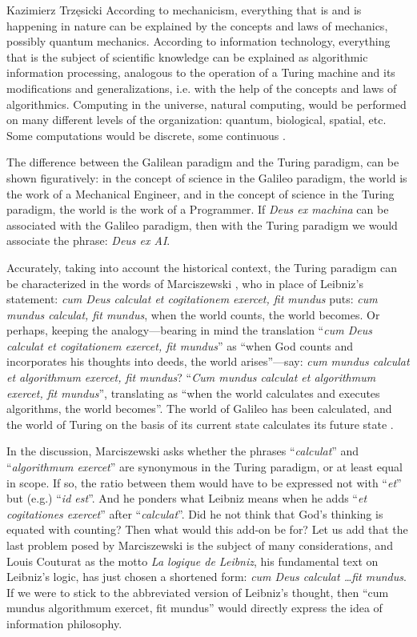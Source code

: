 \begin{artengenv}{Kazimierz Trzęsicki}
According to mechanicism, everything that is and is happening in nature can be explained by the concepts and laws of mechanics, possibly quantum mechanics. According to information technology, everything that is the subject of scientific knowledge can be explained as algorithmic information processing, analogous to the operation of a Turing machine and its modifications and generalizations, i.e. with the help of the concepts and laws of algorithmics. Computing in the universe, natural computing, would be performed on many different levels of the organization: quantum, biological, spatial, etc. Some computations would be discrete, some continuous \parencite{Lesne2007}.

The difference between the Galilean paradigm and the Turing paradigm, can be shown figuratively: in the concept of science in the Galileo paradigm, the world is the work of a Mechanical Engineer, and in the concept of science in the Turing paradigm, the world is the work of a Programmer. If \emph{Deus ex machina} can be associated with the Galileo paradigm, then with the Turing paradigm we would associate the phrase: \emph{Deus ex AI}.

Accurately, taking into account the historical context, the Turing paradigm can be characterized in the words of Marciszewski \parencite[p.153]{MarciszewskiStacewicz2011}, who in place of Leibniz's statement: \emph{cum Deus calculat et cogitationem exercet, fit mundus} puts: \emph{cum mundus calculat, fit mundus}, when the world counts, the world becomes. Or perhaps, keeping the analogy---bearing in mind the translation ``\emph{cum Deus calculat et cogitationem exercet, fit mundus}'' as ``when God counts and incorporates his thoughts into deeds, the world arises''---say: \emph{cum mundus calculat et algorithmum exercet, fit mundus}? ``\emph{Cum mundus calculat et algorithmum exercet, fit mundus}'', translating as ``when the world calculates and executes algorithms, the world becomes''. The world of Galileo has been calculated, and the world of Turing on the basis of its current state calculates its future state \parencite[p.13]{Chaitin2007a}.

In the discussion, Marciszewski asks whether the phrases ``\emph{calculat}'' and ``\emph{algorithmum exercet}'' are synonymous in the Turing paradigm, or at least equal in scope. If so, the ratio between them would have to be expressed not with ``\emph{et}'' but (e.g.) ``\emph{id est}''. And he ponders what Leibniz means when he adds ``\emph{et cogitationes exercet}'' after ``\emph{calculat}''. Did he not think that God's thinking is equated with counting? Then what would this add-on be for? Let us add that the last problem posed by Marciszewski is the subject of many considerations, and Louis Couturat \parencite*{Couturat1901} as the motto \emph{La logique de {L}eibniz}, his fundamental text on Leibniz's logic, has just chosen a shortened form: \emph{cum Deus calculat \ldots fit mundus}. If we were to stick to the abbreviated version of Leibniz's thought, then ``cum mundus algorithmum exercet, fit mundus'' would directly express the idea of information philosophy.


\end{artengenv}
